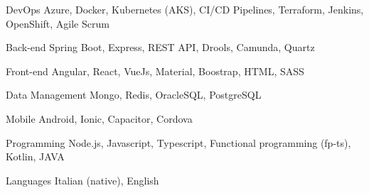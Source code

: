 

\begin{cvskills}

  \cvskill
    {DevOps} %
    {Azure, Docker, Kubernetes (AKS), CI/CD Pipelines, Terraform, Jenkins, OpenShift, Agile Scrum} %

  \cvskill
    {Back-end} %
    {Spring Boot, Express, REST API, Drools, Camunda, Quartz} %

  \cvskill
    {Front-end} %
    {Angular, React, VueJs, Material, Boostrap, HTML, SASS} %

  \cvskill
    {Data Management} %
    {Mongo, Redis, OracleSQL, PostgreSQL} %

  \cvskill
    {Mobile} %
    {Android, Ionic, Capacitor, Cordova} %

  \cvskill
    {Programming} %
    {Node.js, Javascript, Typescript, Functional programming (fp-ts), Kotlin, JAVA} %

  \cvskill
    {Languages} %
    {Italian (native), English} %

\end{cvskills}
